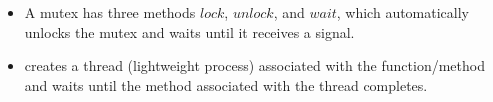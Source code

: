 \begin{itemize}
	
	
	
	
	
	
	\item A mutex has three methods $lock$, $unlock$, and $wait$, which automatically unlocks the mutex and waits until it receives a signal.  
	
	
	
	
	
	\item {} creates a thread (lightweight process) associated with the function/method  and  waits until the method associated with the thread  completes.
\end{itemize} 

